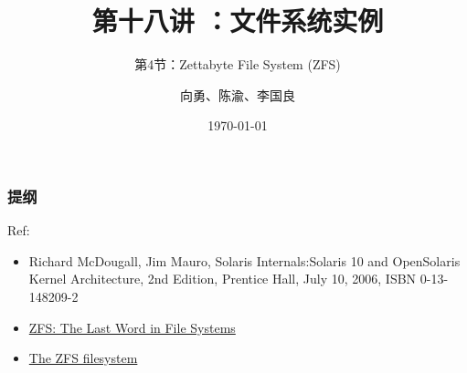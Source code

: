 


\title[第18讲]{第十八讲 ：文件系统实例} %
\subtitle{第4节：Zettabyte File System (ZFS)}
\author{向勇、陈渝、李国良} %
\date{\today} %



\begin{frame}
\titlepage %
\end{frame}

\begin{frame}
\frametitle{提纲} %
\tableofcontents %

Ref:
    \begin{itemize}
        \item Richard McDougall, Jim Mauro, Solaris Internals:Solaris 10 and OpenSolaris Kernel Architecture, 2nd Edition, Prentice Hall, July 10, 2006, ISBN 0-13-148209-2
        \item \href{http://pages.cs.wisc.edu/~remzi/OSTEP/Citations/zfs_last.pdf}{ZFS: The Last Word in File Systems}
        \item \href{https://papers.freebsd.org/2020/linux.conf.au/paeps\_The_ZFS\_filesystem.files/paeps\_The\_ZFS\_filesystem.pdf}{The ZFS filesystem}
    \end{itemize}

\end{frame}
% 
% 
% 
% 
